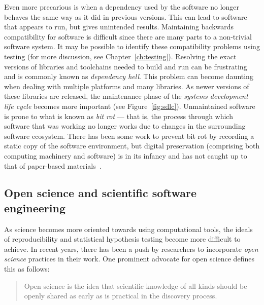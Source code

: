 { %
	Even more precarious is when a dependency used by the
	software no longer behaves the same way as it did in
	previous versions. This can lead to software that appears
	to run, but gives unintended results. Maintaining
	backwards compatibility for software is difficult since
	there are many parts to a non-trivial software system.
	It may be possible to identify these compatibility problems using
	testing (for more discussion, see Chapter~\ref{ch:testing}).
	Resolving the exact versions of libraries and toolchains
	needed to build and run can be frustrating and is commonly
	known as \emph{dependency hell}. This problem can become
	daunting when dealing with multiple platforms and many
	libraries. As newer versions of these libraries are
	released, the maintenance phase of the \emph{systems
	development life cycle} becomes more important (see Figure~\ref{fig:sdlc}).
	Unmaintained software is prone to what is known as
	\emph{bit rot} --- that is, the process through which
	software that was working no longer works due to changes
	in the surrounding software ecosystem.
	There has been some work to prevent bit rot by recording a
	static copy of the software environment, but digital
	preservation (comprising both computing machinery and
	software) is in its infancy and has not caught up to that
	of paper-based materials~\autocite{PreservingExe2013,Thain2015,Meng2015}.
}


\subsection{Open science and scientific software engineering}\label{subsec:open-science}

As science becomes more oriented towards using computational
tools, the ideals of reproducibility and statistical hypothesis
testing become more difficult to achieve. In recent years, there
has been a push by researchers to incorporate \emph{open science}
practices in their work. One prominent advocate for open science
defines this as follows:\\
\parbox{\textwidth}{
\begin{quote}
	\begin{fancyquote}
	Open science is the idea that scientific knowledge of all kinds
	should be openly shared as early as is practical in the discovery
	process.
	\end{fancyquote}
\end{quote}
}

